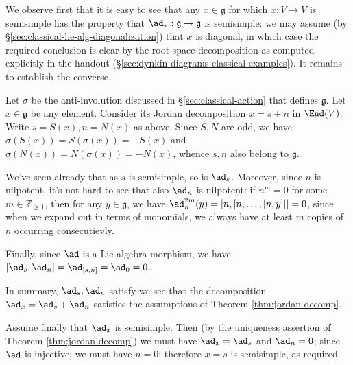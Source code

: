 \documentclass[reqno]{amsart} 
\begin{document}
We observe first that it is easy to see that any $x \in \mathfrak{g}$ for which $x :V \rightarrow V$ is semisimple has the property that $\ad_x : \mathfrak{g} \rightarrow \mathfrak{g}$ is semisimple: we may assume (by \S\ref{sec:classical-lie-alg-diagonalization}) that $x$ is diagonal, in which case the required conclusion is clear by the root space decomposition as computed explicitly in the handout (\S\ref{sec:dynkin-diagrams-classical-examples}).  It remains to establish the converse.

Let $\sigma$ be the anti-involution discussed in \S\ref{sec:classical-action} that defines $\mathfrak{g}$.  Let $x \in \mathfrak{g}$ be any element.  Consider its Jordan decomposition $x = s + n$ in $\End(V)$.  Write $s = S(x), n = N(x)$ as above.  Since $S,N$ are odd, we have $\sigma(S(x)) = S(\sigma(x)) = - S(x)$ and $\sigma(N(x)) = N(\sigma(x)) = - N(x)$, whence $s,n$ also belong to $\mathfrak{g}$.

We've seen already that as $s$ is semisimple, so is $\ad_s$.  Moreover, since $n$ is nilpotent, it's not hard to see that also $\ad_n$ is nilpotent: if $n^m = 0$ for some $m \in \mathbb{Z}_{\geq 1}$, then for any $y \in \mathfrak{g}$, we have $\ad_n^{2 m}(y) = [n,[n,\dotsc,[n,y]]] = 0$, since when we expand out in terms of monomials, we always have at least $m$ copies of $n$ occurring consecutievly.

Finally, since $\ad$ is a Lie algebra morphism, we have $[\ad_s,\ad_n] = \ad_{[s,n]} = \ad_0 = 0$.

In summary, $\ad_s, \ad_n$ satisfy we see that the decomposition $\ad_x = \ad_s + \ad_n$ satisfies the assumptions of Theorem \ref{thm:jordan-decomp}.

Assume finally that $\ad_x$ is semisimple.  Then (by the uniqueness assertion of Theorem \ref{thm:jordan-decomp}) we must have $\ad_x = \ad_s$ and $\ad_n = 0$; since $\ad$ is injective, we must have $n = 0$; therefore $x = s$ is semisimple, as required.
\end{document}
